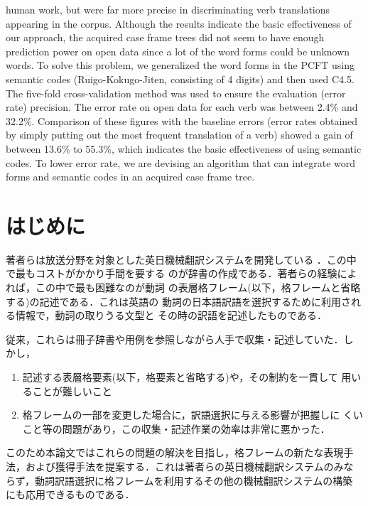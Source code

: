 {human work, but were far more precise in discriminating verb
translations appearing in the corpus.  Although the results indicate
the basic effectiveness of our approach, the acquired case frame trees
did not seem to have enough prediction power on open data since a lot
of the word forms could be unknown words.
To solve this problem, we generalized the word forms in the PCFT using
semantic codes (Ruigo-Kokugo-Jiten, consisting of 4 digits) and then
used C4.5.  The five-fold cross-validation method was used to ensure
the evaluation (error rate) precision.  The error rate on open data
for each verb was between 2.4\% and 32.2\%.  Comparison of these
figures with the baseline errors (error rates obtained by simply
putting out the most frequent translation of a verb) showed a gain of
between 13.6\% to 55.3\%, which indicates the basic effectiveness of
using semantic codes. 
To lower error rate, we are devising an algorithm that can integrate
word forms and semantic codes in an acquired case frame tree.  }



\maketitle


\vspace*{-0.2mm}
\section{はじめに}

著者らは放送分野を対象とした英日機械翻訳システムを開発している
\cite{Aiz90,Tan93,TanAndHat94}．この中で最もコストがかかり手間を要する
のが辞書の作成である．著者らの経験によれば，この中で最も困難なのが動詞
の表層格フレーム(以下，格フレームと省略する)の記述である．これは英語の
動詞の日本語訳語を選択するために利用される情報で，動詞の取りうる文型と
その時の訳語を記述したものである．

従来，これらは冊子辞書や用例を参照しながら人手で収集・記述していた．し
かし，
\begin{enumerate}
\item 記述する表層格要素(以下，格要素と省略する)や，その制約を一貫して
  用いることが難しいこと
\item 格フレームの一部を変更した場合に，訳語選択に与える影響が把握しに
  くいこと等の問題があり，この収集・記述作業の効率は非常に悪かった．
\end{enumerate}
このため本論文ではこれらの問題の解決を目指し，格フレームの新たな表現手
法，および獲得手法を提案する．これは著者らの英日機械翻訳システムのみな
らず，動詞訳語選択に格フレームを利用するその他の機械翻訳システムの構築
にも応用できるものである．

